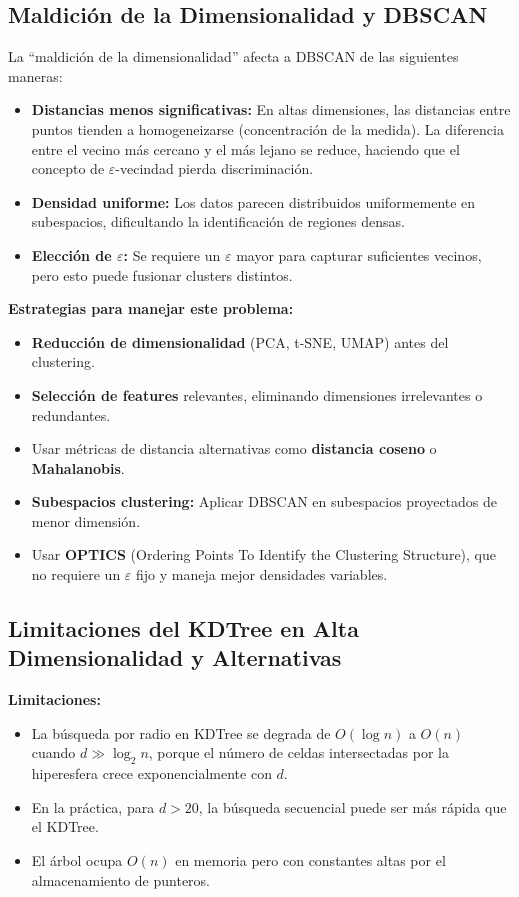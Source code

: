\documentclass[12pt,a4paper]{article}
\begin{document}
\subsection{Maldición de la Dimensionalidad y DBSCAN}

La ``maldición de la dimensionalidad'' afecta a DBSCAN de las siguientes maneras:

\begin{itemize}
    \item \textbf{Distancias menos significativas:} En altas dimensiones, las distancias entre puntos tienden a homogeneizarse (concentración de la medida). La diferencia entre el vecino más cercano y el más lejano se reduce, haciendo que el concepto de $\varepsilon$-vecindad pierda discriminación.
    
    \item \textbf{Densidad uniforme:} Los datos parecen distribuidos uniformemente en subespacios, dificultando la identificación de regiones densas.
    
    \item \textbf{Elección de $\varepsilon$:} Se requiere un $\varepsilon$ mayor para capturar suficientes vecinos, pero esto puede fusionar clusters distintos.
\end{itemize}

\textbf{Estrategias para manejar este problema:}
\begin{itemize}
    \item \textbf{Reducción de dimensionalidad} (PCA, t-SNE, UMAP) antes del clustering.
    \item \textbf{Selección de features} relevantes, eliminando dimensiones irrelevantes o redundantes.
    \item Usar métricas de distancia alternativas como \textbf{distancia coseno} o \textbf{Mahalanobis}.
    \item \textbf{Subespacios clustering:} Aplicar DBSCAN en subespacios proyectados de menor dimensión.
    \item Usar \textbf{OPTICS} (Ordering Points To Identify the Clustering Structure), que no requiere un $\varepsilon$ fijo y maneja mejor densidades variables.
\end{itemize}

\subsection{Limitaciones del KDTree en Alta Dimensionalidad y Alternativas}

\textbf{Limitaciones:}
\begin{itemize}
    \item La búsqueda por radio en KDTree se degrada de $O(\log n)$ a $O(n)$ cuando $d \gg \log_2 n$, porque el número de celdas intersectadas por la hiperesfera crece exponencialmente con $d$.
    \item En la práctica, para $d > 20$, la búsqueda secuencial puede ser más rápida que el KDTree.
    \item El árbol ocupa $O(n)$ en memoria pero con constantes altas por el almacenamiento de punteros.
\end{itemize}
\end{document}
